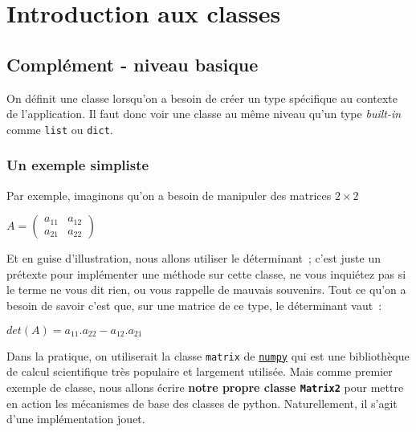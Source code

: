     
    
    
    

    

    \hypertarget{introduction-aux-classes}{%
\section{Introduction aux classes}\label{introduction-aux-classes}}

    \hypertarget{compluxe9ment---niveau-basique}{%
\subsection{Complément - niveau
basique}\label{compluxe9ment---niveau-basique}}

    On définit une classe lorsqu'on a besoin de créer un type spécifique au
contexte de l'application. Il faut donc voir une classe au même niveau
qu'un type \emph{built-in} comme \texttt{list} ou \texttt{dict}.

    \hypertarget{un-exemple-simpliste}{%
\subsubsection{Un exemple simpliste}\label{un-exemple-simpliste}}

    Par exemple, imaginons qu'on a besoin de manipuler des matrices
\(2\times 2\)

\(A = \left( \begin{array}{cc} a_{11} & a_{12} \\ a_{21} & a_{22}\end{array} \right)\)

Et en guise d'illustration, nous allons utiliser le déterminant~; c'est
juste un prétexte pour implémenter une méthode sur cette classe, ne vous
inquiétez pas si le terme ne vous dit rien, ou vous rappelle de mauvais
souvenirs. Tout ce qu'on a besoin de savoir c'est que, sur une matrice
de ce type, le déterminant vaut~:

\(det (A) = a_{11}.a_{22} - a_{12}.a_{21}\)

    Dans la pratique, on utiliserait la classe \texttt{matrix} de
\href{http://www.numpy.org/}{\texttt{numpy}} qui est une bibliothèque de
calcul scientifique très populaire et largement utilisée. Mais comme
premier exemple de classe, nous allons écrire \textbf{notre propre
classe \texttt{Matrix2}} pour mettre en action les mécanismes de base
des classes de python. Naturellement, il s'agit d'une implémentation
jouet.

